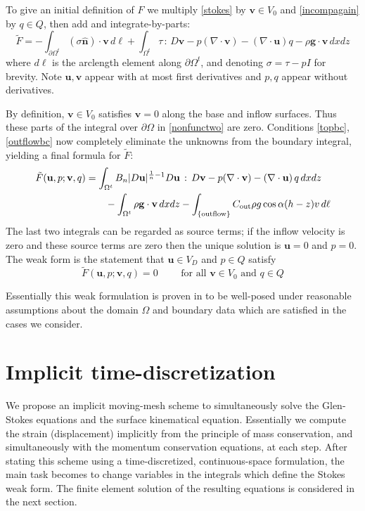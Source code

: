 \documentclass[letterpaper,final,12pt,reqno]{amsart}
\newcommand{\hbn}{\hat{\mathbf{n}}}
\newcommand{\bu}{\mathbf{u}}
\newcommand{\bv}{\mathbf{v}}
\begin{document}
To give an initial definition of $F$ we multiply \eqref{stokes} by $\bv\in V_0$ and \eqref{incompagain} by $q\in Q$, then add and integrate-by-parts:
\begin{equation}
\tilde F = -\int_{\partial\Omega^t} (\sigma \hbn)\cdot \bv\,d\ell + \int_{\Omega^t} \tau \,:\,D\bv - p (\nabla \cdot \bv) - \left(\nabla \cdot \bu\right) q - \rho \mathbf{g} \cdot \bv \,dx dz \label{nonfunctwo}
\end{equation}
where $d\ell$ is the arclength element along $\partial\Omega^t$, and denoting $\sigma=\tau-pI$ for brevity.  Note $\bu,\bv$ appear with at most first derivatives and $p,q$ appear without derivatives.

By definition, $\bv\in V_0$ satisfies $\bv=0$ along the base and inflow surfaces.  Thus these parts of the integral over $\partial\Omega$ in \eqref{nonfunctwo} are zero.  Conditions \eqref{topbc}, \eqref{outflowbc} now completely eliminate the unknowns from the boundary integral, yielding a final formula for $\tilde F$:
\begin{align}
\tilde F(\bu,p;\bv,q) &= \int_{\Omega^t} B_n |D\bu|^{\frac{1}{n} - 1} D\bu\,:\,D\bv - p (\nabla \cdot \bv) - \left(\nabla \cdot \bu\right) q \,dx dz \label{defineF} \\
    &\qquad  - \int_{\Omega^t} \rho \mathbf{g} \cdot \bv \,dx dz - \int_{\{\text{outflow}\}} C_{\text{out}} \rho g \cos\alpha (h-z) v \,d\ell \notag
\end{align}
The last two integrals can be regarded as source terms; if the inflow velocity is zero and these source terms are zero then the unique solution is $\bu=0$ and $p=0$.  The weak form is the statement that $\bu\in V_D$ and $p\in Q$ satisfy
\begin{equation}
\tilde F(\bu,p;\bv,q) = 0 \qquad \text{ for all } \bv\in V_0 \text{ and } q\in Q  \label{weak}
\end{equation}

Essentially this weak formulation is proven in \cite[Theorem 3.8]{JouvetRappaz2011} to be well-posed under reasonable assumptions about the domain $\Omega$ and boundary data which are satisfied in the cases we consider.


\section{Implicit time-discretization} \label{sec:implicitstep}

We propose an implicit moving-mesh scheme to simultaneously solve the Glen-Stokes equations and the surface kinematical equation.  Essentially we compute the strain (displacement) implicitly from the principle of mass conservation, and simultaneously with the momentum conservation equations, at each step.  After stating this scheme using a time-discretized, continuous-space formulation, the main task becomes to change variables in the integrals which define the Stokes weak form.  The finite element solution of the resulting equations is considered in the next section.
\end{document}
